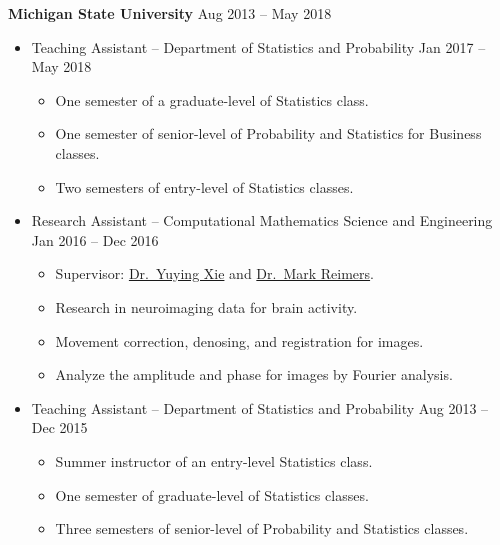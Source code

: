 \documentclass[a4paper,10pt,dvipdfmx]{article}
\begin{document}
\textbf{Michigan State University} \hfill Aug 2013 -- May 2018
\begin{itemize}[noitemsep,nolistsep]
  \item[] Teaching Assistant -- Department of Statistics and Probability \hfill Jan 2017 -- May 2018
    \begin{itemize}[noitemsep,nolistsep]
      \item One semester of a graduate-level of Statistics class.
      \item One semester of senior-level of Probability and Statistics for Business classes.
      \item Two semesters of entry-level of Statistics classes.
    \end{itemize}
  \item[] Research Assistant -- Computational Mathematics Science and Engineering \hfill Jan 2016 -- Dec 2016
    \begin{itemize}[noitemsep,nolistsep]
      \item[] \hspace{-3ex} Supervisor: \href{https://cmse.msu.edu/directory/faculty/yuying-xie/}{Dr.~Yuying Xie} and \href{https://msu.edu/~reimersm/}{Dr.~Mark Reimers}.
      \item Research in neuroimaging data for brain activity.
      \item Movement correction, denosing, and registration for images.
      \item Analyze the amplitude and phase for images by Fourier analysis.
    \end{itemize}
  \item[] Teaching Assistant -- Department of Statistics and Probability \hfill Aug 2013 -- Dec 2015
    \begin{itemize}[noitemsep,nolistsep]
      \item Summer instructor of an entry-level Statistics class.
      \item One semester of graduate-level of Statistics classes.
      \item Three semesters of senior-level of Probability and Statistics classes.\\
    \end{itemize}
\end{itemize}
\end{document}
